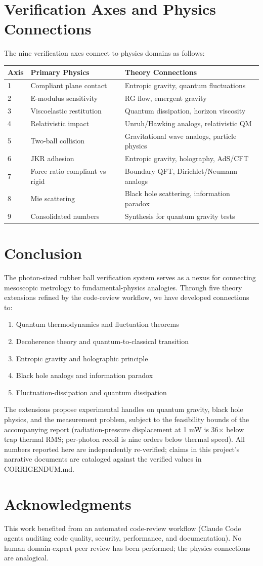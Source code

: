 \documentclass[11pt]{article}
\begin{document}
\section{Verification Axes and Physics Connections}
The nine verification axes connect to physics domains as follows:

\begin{tabular}{lp{2.5in}p{2in}}
\toprule
Axis & Primary Physics & Theory Connections \\
\midrule
1 & Compliant plane contact & Entropic gravity, quantum fluctuations \\
2 & E-modulus sensitivity & RG flow, emergent gravity \\
3 & Viscoelastic restitution & Quantum dissipation, horizon viscosity \\
4 & Relativistic impact & Unruh/Hawking analogs, relativistic QM \\
5 & Two-ball collision & Gravitational wave analogs, particle physics \\
6 & JKR adhesion & Entropic gravity, holography, AdS/CFT \\
7 & Force ratio compliant vs rigid & Boundary QFT, Dirichlet/Neumann analogs \\
8 & Mie scattering & Black hole scattering, information paradox \\
9 & Consolidated numbers & Synthesis for quantum gravity tests \\
\bottomrule
\end{tabular}

\section{Conclusion}
The photon-sized rubber ball verification system serves as a nexus for connecting mesoscopic metrology to fundamental-physics analogies. Through five theory extensions refined by the code-review workflow, we have developed connections to:
\begin{enumerate}
\item Quantum thermodynamics and fluctuation theorems
\item Decoherence theory and quantum-to-classical transition
\item Entropic gravity and holographic principle
\item Black hole analogs and information paradox
\item Fluctuation-dissipation and quantum dissipation
\end{enumerate}
The extensions propose experimental handles on quantum gravity, black hole physics, and the measurement problem, subject to the feasibility bounds of the accompanying report (radiation-pressure displacement at 1 mW is 36$\times$ below trap thermal RMS; per-photon recoil is nine orders below thermal speed). All numbers reported here are independently re-verified; claims in this project's narrative documents are cataloged against the verified values in CORRIGENDUM.md.

\section*{Acknowledgments}
This work benefited from an automated code-review workflow (Claude Code agents auditing code quality, security, performance, and documentation). No human domain-expert peer review has been performed; the physics connections are analogical.
\end{document}
